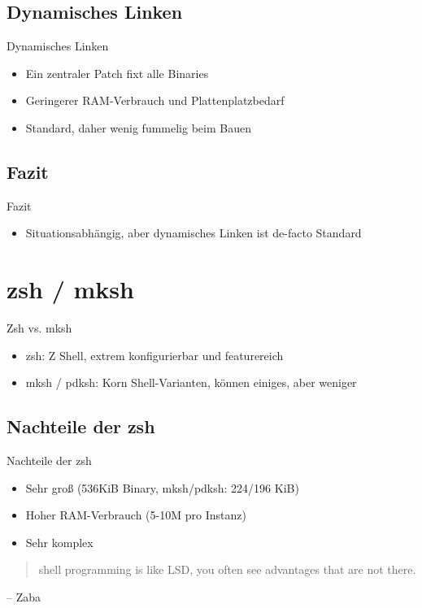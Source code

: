 \documentclass{beamer}
\begin{document}
\subsection{Dynamisches Linken}
\begin{frame}{Dynamisches Linken}
	\begin{itemize}
		\item Ein zentraler Patch fixt alle Binaries
		\pause \item Geringerer RAM-Verbrauch und Plattenplatzbedarf
		\pause \item Standard, daher wenig fummelig beim Bauen
	\end{itemize}
\end{frame}

\subsection{Fazit}
\begin{frame}{Fazit}
	\begin{itemize}
		\item Situationsabhängig, aber dynamisches Linken ist de-facto
			Standard
	\end{itemize}
\end{frame}

\section{zsh / mksh}
\begin{frame}{Zsh vs. mksh}
	\begin{itemize}
		\item zsh: Z Shell, extrem konfigurierbar und featurereich
		\item mksh / pdksh: Korn Shell-Varianten, können einiges, aber weniger
	\end{itemize}
\end{frame}

\subsection{Nachteile der zsh}
\begin{frame}{Nachteile der zsh}
	\begin{itemize}
		\item Sehr groß (536KiB Binary, mksh/pdksh: 224/196 KiB)
		\pause \item Hoher RAM-Verbrauch (5-10M pro Instanz)
		\pause \item Sehr komplex %
	\end{itemize}
	\pause
	\begin{quote}
		shell programming is like LSD, you often see advantages that are not
		there.
	\end{quote}
	\begin{flushright}
		-- Zaba
	\end{flushright}
\end{frame}
\end{document}
